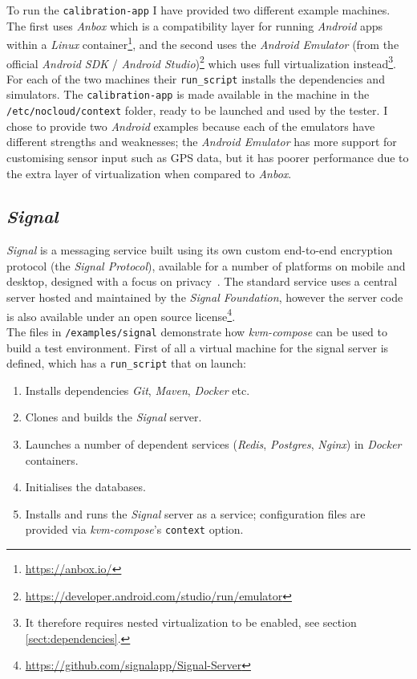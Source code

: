 \documentclass[
    author={Jacob Daniel Halsey},
    supervisor={Prof. Awais Rashid},
    degree={BSc},
    title={Building a Testbed for Evaluating Privacy Enhancing Technologies  (PETs)},
    subtitle={},
    type={software development},
    year={2021}
]{dissertation}
\begin{document}
To run the \texttt{calibration-app} I have provided two different example machines. The first
uses \emph{Anbox} which is a compatibility layer for running \emph{Android} apps within a \emph{Linux}
container\footnote{\url{https://anbox.io/}}, and the second uses the \emph{Android Emulator} 
(from the official \emph{Android SDK} / 
\emph{Android Studio})\footnote{\url{https://developer.android.com/studio/run/emulator}}
which uses full virtualization instead\footnote{It therefore requires nested 
virtualization to be enabled, see section \ref{sect:dependencies}.}.
For each of the two machines their \texttt{run\_script} installs the
dependencies and simulators. The \texttt{calibration-app} is made available in the machine in the 
\texttt{/etc/nocloud/context} folder, ready to be launched and used by the tester.
I chose to provide two \emph{Android} examples because each of the emulators have different
strengths and weaknesses; the \emph{Android Emulator} has more support for customising sensor
input such as GPS data, but it has poorer performance due to the extra layer of virtualization
when compared to \emph{Anbox}.

\subsection{\emph{Signal}}

\emph{Signal} is a messaging service built using its own custom end-to-end encryption protocol 
(the \emph{Signal Protocol}), available for a number of platforms on mobile and desktop,
designed with a focus on privacy~\cite{signal}. The standard service uses a central server
hosted and maintained by the \emph{Signal Foundation},
however the server code is also available under an open source 
license\footnote{\url{https://github.com/signalapp/Signal-Server}}. \\

The files in \texttt{/examples/signal} demonstrate how \emph{kvm-compose} can be used to build
a test environment. First of all a virtual machine for the signal server is defined,
which has a \texttt{run\_script} that on launch:

\begin{singlespace}
	\begin{enumerate}
		\item Installs dependencies \emph{Git}, \emph{Maven}, \emph{Docker} etc.
		\item Clones and builds the \emph{Signal} server.
		\item Launches a number of dependent services (\emph{Redis}, \emph{Postgres}, \emph{Nginx})
		in \emph{Docker} containers.
		\item Initialises the databases.
		\item Installs and runs the \emph{Signal} server as a service; configuration files
		are provided via \emph{kvm-compose}'s \texttt{context} option.
	\end{enumerate}
\end{singlespace}
\end{document}
